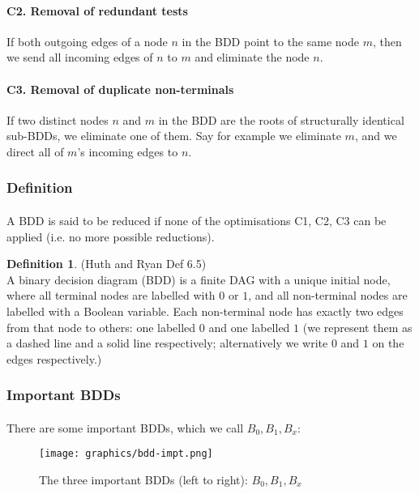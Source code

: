 \documentclass{article}
\theoremstyle{plain}
\theoremstyle{definition}
\newtheorem{defn}[thm]{Definition} %
\begin{document}
\begin{multicols}{2}
\paragraph{C2. Removal of redundant tests} If both outgoing edges of a node $n$ in the BDD point to the same node $m$, then we send all incoming edges of $n$ to $m$ and eliminate the node $n$.

\paragraph{C3. Removal of duplicate non-terminals} If two distinct nodes $n$ and $m$ in the BDD are the roots of structurally identical sub-BDDs, we eliminate one of them. Say for example we eliminate $m$, and we direct all of $m$'s incoming edges to $n$.

\subsubsection{Definition}

\paragraph{} A BDD is said to be reduced if none of the optimisations C1, C2, C3 can be applied (i.e. no more possible reductions). 

\begin{defn}
(Huth and Ryan Def 6.5)\\ A binary decision diagram (BDD) is a finite DAG with a unique initial node, where all terminal nodes are labelled with $0$ or $1$, and all non-terminal nodes are labelled with a Boolean variable. Each non-terminal node has exactly two edges from that node to others: one labelled $0$ and one labelled $1$ (we represent them as a dashed line and a solid line respectively; alternatively we write $0$ and $1$ on the edges respectively.)
\end{defn}

\subsubsection{Important BDDs}

\paragraph{} There are some important BDDs, which we call $B_0, B_1, B_x$:

\begin{figure}[H]
\centering
\texttt{[image: graphics/bdd-impt.png]}
\caption{The three important BDDs (left to right): $B_0, B_1, B_x$}
\end{figure}


\end{multicols}
\end{document}
